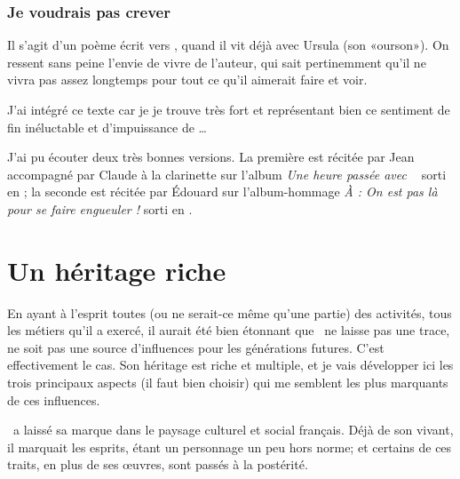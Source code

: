 \subsubsection{Je voudrais pas crever}
Il s'agit d'un poème écrit vers , quand il vit déjà avec Ursula
(son «ourson»). On ressent sans peine l'envie de vivre de
l'auteur, qui sait pertinemment qu'il ne vivra pas assez longtemps pour
tout ce qu'il aimerait faire et voir.

\begin{multicols}{2}
{\footnotesize
\settowidth{\versewidth}{Où valsent les brins d'algues}
\begin{verse}

\end{verse}
}
\end{multicols}

J'ai intégré ce texte car je je trouve très fort et représentant bien ce sentiment de fin inéluctable et d'impuissance de \BV\ldots

J'ai pu écouter
deux très bonnes versions. La première est récitée par Jean  accompagné
par Claude  à la clarinette sur l'album \emph{Une heure passée avec \BV\ }
sorti en ; la seconde est récitée par Édouard  sur
l'album-hommage \emph{À \BV: On est pas là pour se faire engueuler !} sorti en .

\section{Un héritage riche}

En ayant à l'esprit toutes (ou ne serait-ce même qu'une partie) des activités,
tous les métiers qu'il a exercé, il aurait été bien étonnant que \BV\ ne
laisse pas une trace, ne soit pas une source d'influences pour les générations
futures.
C'est effectivement le cas. Son héritage est riche et multiple, et je vais
développer ici les trois principaux aspects (il faut bien choisir) qui me semblent
les plus marquants de ces influences.


\BV\ a laissé sa marque dans le paysage culturel et social français. Déjà
de son vivant, il marquait les esprits, étant un personnage un peu hors norme; et
certains de ces traits, en plus de ses \oe{}uvres, sont passés à la postérité.

